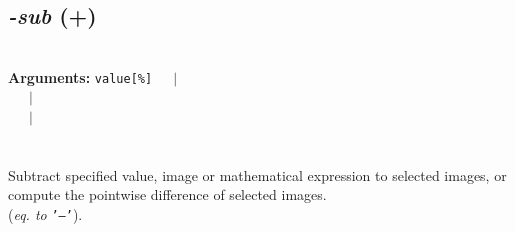 \documentclass[a4paper,11pt,twoside]{book}
\begin{document}
\subsection{\emph{-sub} (+)}\vspace*{-0.5em}
~\\\textbf{Arguments: } 
{\small \texttt{value[\%]}}~~~$|$\\
\hspace*{2.2cm}{\small \texttt{[image]}}~~~$|$\\
~~~$|$\\
\\~\\
Subtract specified value, image or mathematical expression to selected images,
or compute the pointwise difference of selected images.
~\\(\emph{eq. to} {\small \texttt{'--'}}).
\end{document}
